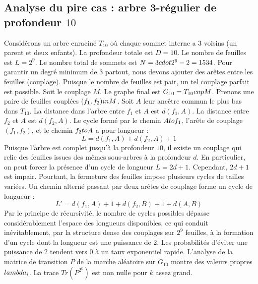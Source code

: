 \documentclass[12pt,a4paper]{article}
\begin{document}
\subsection{Analyse du pire cas : arbre 3-r\'egulier de profondeur $10$}
Consid\'erons un arbre enracin\'e $T_{10}$ o\`u chaque sommet interne a 3 voisins (un parent et deux enfants).
La profondeur totale est $D = 10$.
Le nombre de feuilles est $L = 2^{9}$.
Le nombre total de sommets est $N = 3 \\cdot 2^{9} - 2 = 1534$.
Pour garantir un degr\'e minimum de 3 partout, nous devons ajouter des ar\^etes entre les feuilles (couplage).
Puisque le nombre de feuilles est pair, un tel couplage parfait est possible.
Soit le couplage $M$. Le graphe final est $G_{10} = T_{10} \\cup M$.
Prenons une paire de feuilles coupl\'ees $(f_1, f_2) \\in M$.
Soit $A$ leur anc\^etre commun le plus bas dans $T_{10}$.
La distance dans l'arbre entre $f_1$ et $A$ est $d(f_1, A)$.
La distance entre $f_2$ et $A$ est $d(f_2, A)$.
Le cycle form\'e par le chemin $A \\to f_1$, l'ar\^ete de couplage $(f_1, f_2)$, et le chemin $f_2 \\to A$ a pour longueur :
$$ L = d(f_1, A) + d(f_2, A) + 1 $$
Puisque l'arbre est complet jusqu'\`a la profondeur $10$, il existe un couplage qui relie des feuilles issues des m\^emes sous-arbres \`a la profondeur $d$.
En particulier, on peut forcer la pr\'esence d'un cycle de longueur $L = 2d + 1$. Cependant, $2d+1$ est impair.
Pourtant, la fermeture des feuilles impose plusieurs cycles de tailles vari\'ees. Un chemin altern\'e passant par deux ar\^etes de couplage forme un cycle de longueur :
$$ L' = d(f_1, A) + 1 + d(f_2, B) + 1 + d(A, B) $$
Par le principe de r\'ecursivit\'e, le nombre de cycles possibles d\'epasse consid\'erablement l'espace des longueurs disponibles, ce qui conduit in\'evitablement, par la structure dense des couplages sur $2^{9}$ feuilles, \`a la formation d'un cycle dont la longueur est une puissance de 2. Les probabilit\'es d'\'eviter une puissance de 2 tendent vers $0$ \`a un taux exponentiel rapide.
L'analyse de la matrice de transition $P$ de la marche al\'eatoire sur $G_{10}$ montre des valeurs propres $\\lambda_i$. La trace $Tr(P^{2^k})$ est non nulle pour $k$ assez grand.
\end{document}
